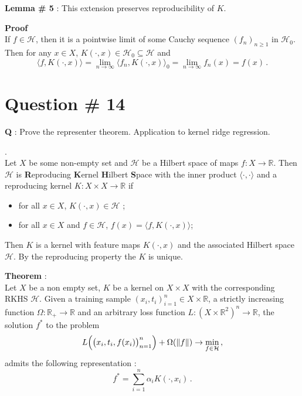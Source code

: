 \documentclass[a4paper]{article}
\newcommand{\Real}{\mathbb{R}}
\newcommand{\Hcal}{\mathcal{H}}
\begin{document}
\noindent\textbf{Lemma \# 5} : This extension preserves reproducibility of $K$.

\noindent\textbf{Proof} \hfill \\
If $f\in \Hcal$, then it is a pointwise limit of some Cauchy sequence $(f_n)_{n\geq1}$
in $\Hcal_0$. Then for any $x\in X$, $K(\cdot, x)\in \Hcal_0 \subseteq \Hcal$ and
\[
\langle f, K(\cdot, x)\rangle
= \lim_{n\to\infty} \langle f_n, K(\cdot, x)\rangle_0
= \lim_{n\to\infty} f_n(x)
= f(x)\,.
\]


\clearpage

\section{Question \# 14} %
\label{sec:question_14}
\textbf{\large \textbf{Q}} : Prove the representer theorem. Application to kernel
ridge regression.

 .\hfill\\
Let $X$ be some non-empty set and $\Hcal$ be a Hilbert space of maps $f:X\to\Real$.
Then $\Hcal$ is \textbf{R}eproducing \textbf{K}ernel \textbf{H}ilbert \textbf{S}pace
with the inner product $\langle\cdot, \cdot\rangle$ and a reproducing kernel $K: X\times X\to \Real$
if \begin{itemize}
	\item for all $x\in X$, $K(\cdot,x) \in \Hcal$ ;
	\item for all $x\in X$ and $f\in \Hcal$, $f(x) = \langle f, K(\cdot, x) \rangle$;
\end{itemize}
Then $K$ is a kernel with feature maps $K(\cdot,x)$ and the associated Hilbert space
$\Hcal$. By the reproducing property the $K$ is unique.

\noindent\textbf{Theorem} : \hfill\\
Let $X$ be a non empty set, $K$ be a kernel on $X\times X$ with the corresponding
RKHS $\Hcal$. Given a training sample $(x_i, t_i)_{i=1}^n \in X \times \Real$, a
strictly increasing function $\Omega:\Real_+\to\Real$ and an arbitrary loss function
$L:( X\times \Real^2)^n \to \Real$, the solution $f^*$ to the problem
\[
L\Bigl( \bigl(x_i,t_i,f(x_i)\bigr)_{n=1}^n \Bigr) + \Omega(\|f\|) \to \min_{f\in \Hcal}\,,
\]
admits the following representation :
\[ f^* = \sum_{i=1}^n \alpha_i K( \cdot, x_i ) \,. \]
\end{document}
